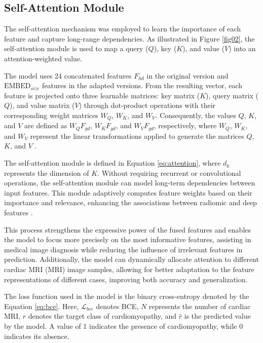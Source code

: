 \documentclass[journal,twoside,web]{ieeecolor}
\begin{document}
\subsection{Self-Attention Module}

The self-attention mechanism was employed to learn the importance of each feature and capture long-range dependencies. As illustrated in Figure \ref{fig02}, the self-attention module is used to map a query ($Q$), key ($K$), and value ($V$) into an attention-weighted value.  

The model uses 24 concatenated features $F_{hd}$ in the original version and $\text{EMBED}_{size}$ features in the adapted versions. From the resulting vector, each feature is projected onto three learnable matrices: key matrix ($K$), query matrix ($Q$), and value matrix ($V$) through dot-product operations with their corresponding weight matrices $W_{Q}$, $W_{K}$, and $W_{V}$. Consequently, the values $Q$, $K$, and $V$ are defined as $W_{Q}F_{gd}$, $W_{K}F_{gd}$, and $W_{V}F_{gd}$, respectively, where $W_{Q}$, $W_{K}$, and $W_{V}$ represent the linear transformations applied to generate the matrices $Q$, $K$, and $V$ \cite{vaswaniAttentionAllYou2023}.  

The self-attention module is defined in Equation \ref{eq:attention}, where $d_{k}$ represents the dimension of $K$. Without requiring recurrent or convolutional operations, the self-attention module can model long-term dependencies between input features. This module adaptively computes feature weights based on their importance and relevance, enhancing the associations between radiomic and deep features \cite{vaswaniAttentionAllYou2023}.  

This process strengthens the expressive power of the fused features and enables the model to focus more precisely on the most informative features, assisting in medical image diagnosis while reducing the influence of irrelevant features in prediction. Additionally, the model can dynamically allocate attention to different cardiac MRI (\gls{MRI}) image samples, allowing for better adaptation to the feature representations of different cases, improving both accuracy and generalization.  

The loss function used in the model is the binary cross-entropy denoted by the Equation \ref{eq:bce}. Here, $\mathcal{L}_{bce}$ denotes \gls{BCE}, $N$ represents the number of cardiac \gls{MRI}, $r$ denotes the target class of cardiomyopathy, and $\hat{r}$ is the predicted value by the model. A value of 1 indicates the presence of cardiomyopathy, while 0 indicates its absence.
\end{document}
